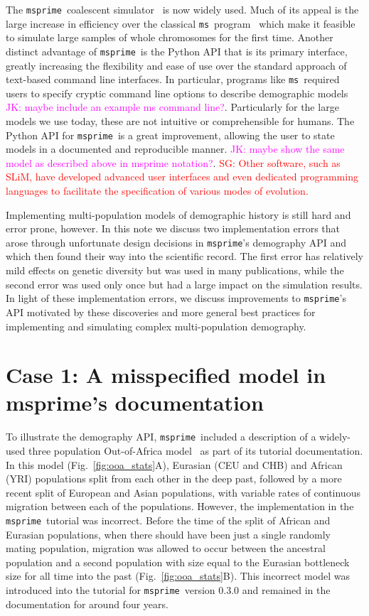 \documentclass{article}
\newcommand{\msprime}[0]{\texttt{msprime}}
\newcommand{\ms}[0]{\texttt{ms}}
\newcommand{\sgcomment}[1]{{\textcolor{red}{SG: #1}}}
\newcommand{\jkcomment}[1]{{\textcolor{magenta}{JK: #1}}}
\begin{document}
The \msprime\ coalescent
simulator~\citep{kelleher2016efficient,nelson2020accounting,kelleher2020coalescent}
is now widely used. Much of its appeal is the large increase in efficiency over the classical
\ms\ program~\citep{hudson2002generating} which make it feasible to simulate large
samples of whole chromosomes for the first time. Another distinct advantage
of \msprime\ is the Python API that is its primary interface, greatly
increasing the flexibility and ease of use over the standard approach of
text-based command line interfaces. In particular, programs like \ms\
required users to specify cryptic command line options to describe demographic
models \jkcomment{maybe include an example ms command line?}. Particularly for
the large models we use today, these are not intuitive or comprehensible for humans.
The Python API for \msprime\ is a great improvement, allowing the user to
state models in a documented and reproducible manner. \jkcomment{maybe show
the same model as described above in msprime notation?}. \sgcomment{Other software, such as SLiM, 
have developed advanced user interfaces and even dedicated programming languages 
to facilitate the specification of various modes of evolution.\cite{}
}

Implementing multi-population models of demographic history is still hard and error
prone, however. In this note we discuss two implementation errors that arose through
unfortunate design decisions in \msprime's demography API and which then found their way
into the scientific record. The first error has relatively mild effects on genetic diversity but was 
used in many publications, while the second error was used only once but had a large impact on the 
simulation results.  
In light of these implementation errors, we discuss improvements to \msprime's API motivated by these
discoveries and more general best practices for implementing and simulating complex multi-population
demography.

\section*{Case 1: A misspecified model in msprime's documentation}

To illustrate the demography API, \msprime\ included a description of a widely-used
three population Out-of-Africa model~\citep{gutenkunst2009inferring}
as part of its tutorial documentation. In this model (Fig.~\ref{fig:ooa_stats}A),
Eurasian (CEU and CHB) and African (YRI) populations split from each other in the deep past,
followed by a more recent split of European and Asian populations, with variable rates of
continuous migration between each of the populations. However, the implementation in the
\msprime\ tutorial was incorrect. Before the time of the split of African and Eurasian
populations, when there should have been just a single randomly mating population, migration was
allowed to occur between the ancestral population and a second population with size equal to
the Eurasian bottleneck size for all time into the past
(Fig.~\ref{fig:ooa_stats}B). This incorrect model was introduced into
the tutorial for \msprime\ version 0.3.0 and remained in the documentation for
around four years.
\end{document}
